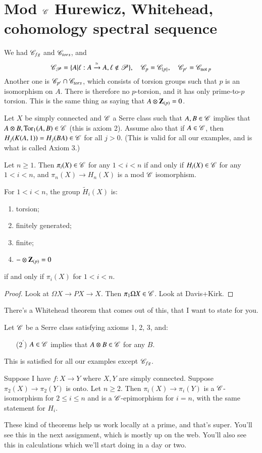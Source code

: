\section{Mod $\mathscr C$ Hurewicz, Whitehead, cohomology spectral sequence}
We had $\mathscr C_{fg}$ and $\mathscr C_{tors}$, and
$$
\mathscr C_\mathscr P = \{A|\ell:A\xrightarrow{\simeq} A,\ell\not\in\mathscr P\},\quad \mathscr C_p = \mathscr C_{\{p\}},\quad \mathscr C_{p^\prime} = \mathscr C_{\text{not }p}
$$
Another one is $\mathscr C_{p^\prime}\cap \mathscr C_{tors}$, which consists of torsion groups such that $p$ is an isomorphism on $A$.
There is therefore no $p$-torsion, and it has only prime-to-$p$ torsion.
This is the same thing as saying that $A\otimes\mathbf Z_{(p)} = 0$.
\begin{theorem}
    Let $X$ be simply connected and $\mathscr C$ a Serre class such that $A,B\in\mathscr C$ implies that $A\otimes B,\operatorname{Tor}_1(A,B)\in \mathscr C$ (this is axiom 2).
    Assume also that if $A\in\mathscr C$, then $H_j(K(A,1)) = H_j(BA)\in\mathscr C$ for all $j>0$.
    (This is valid for all our examples, and is what is called Axiom 3.)

    Let $n\geq 1$.
    Then $\pi_i(X)\in\mathscr C$ for any $1<i<n$ if and only if $H_i(X)\in\mathscr C$ for any $1<i<n$,
    and $\pi_n(X)\to H_n(X)$ is a mod $\mathscr C$ isomorphism.
\end{theorem}
\begin{example}
    For $1<i<n$, the group $\widetilde{H}_i(X)$ is:
    \begin{enumerate}
	\item torsion;
	\item finitely generated;
	\item finite;
	\item $-\otimes \mathbf Z_{(p)} = 0$
    \end{enumerate}
    if and only if $\pi_i(X)$ for $1<i<n$.
\end{example}
\begin{proof}
    Look at $\Omega X\to PX \to X$.
    Then $\pi_1 \Omega X\in\mathscr C$.
    Look at Davis+Kirk.
\end{proof}
There's a Whitehead theorem that comes out of this, that I want to state for you.
\begin{theorem}
    Let $\mathscr C$ be a Serre class satisfying axioms 1, 2, 3, and:
    \begin{enumerate}
	\item[($2^\prime$)] $A\in\mathscr C$ implies that $A\otimes B\in\mathscr C$ for any $B$.
    \end{enumerate}
    This is satisfied for all our examples except $\mathscr C_{fg}$.

    Suppose I have $f:X\to Y$ where $X,Y$ are simply connected.
    Suppose $\pi_2(X)\to \pi_2(Y)$ is onto.
    Let $n\geq 2$.
    Then $\pi_i(X)\to \pi_i(Y)$ is a $\mathscr C$-isomorphism for $2\leq i\leq n$ and is a $\mathscr C$-epimorphism for $i=n$,
    with the same statement for $H_i$.
\end{theorem}
These kind of theorems help us work locally at a prime, and that's super.
You'll see this in the next assignment, which is mostly up on the web.
You'll also see this in calculations which we'll start doing in a day or two.

